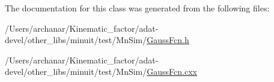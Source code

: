 The documentation for this class was generated from the following files\+:\begin{DoxyCompactItemize}
\item 
/\+Users/archanar/\+Kinematic\+\_\+factor/adat-\/devel/other\+\_\+libs/minuit/test/\+Mn\+Sim/\mbox{\hyperlink{adat-devel_2other__libs_2minuit_2test_2MnSim_2GaussFcn_8h}{Gauss\+Fcn.\+h}}\item 
/\+Users/archanar/\+Kinematic\+\_\+factor/adat-\/devel/other\+\_\+libs/minuit/test/\+Mn\+Sim/\mbox{\hyperlink{adat-devel_2other__libs_2minuit_2test_2MnSim_2GaussFcn_8cxx}{Gauss\+Fcn.\+cxx}}\end{DoxyCompactItemize}
